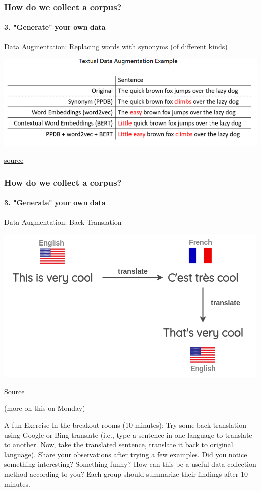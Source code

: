 \documentclass{beamer}
\begin{document}
\begin{frame}
\frametitle{How do we collect a corpus?}
\framesubtitle{3. "Generate" your own data}
Data Augmentation: Replacing words with synonyms (of different kinds) 

\includegraphics[width=\textwidth]{figures/augmentation1.PNG}

\tiny \href{https://github.com/makcedward/nlpaug}{source}
\end{frame}

\begin{frame}
\frametitle{How do we collect a corpus?}
\framesubtitle{3. "Generate" your own data}
Data Augmentation: Back Translation

\includegraphics[width=\textwidth]{figures/backtranslation.PNG}

\tiny \href{https://amitness.com/2020/05/data-augmentation-for-nlp/}{Source}

(more on this on Monday)
\end{frame}


\begin{frame}{A fun Exercise}
In the breakout rooms (10 minutes): Try some back translation using Google or Bing translate (i.e., type a sentence in one language to translate to another. Now, take the translated sentence, translate it back to original language). Share your observations after trying a few examples. Did you notice something interesting? Something funny? How can this be a useful data collection method according to you? Each group should summarize their findings after 10 minutes. 
\end{frame}
\end{document}
